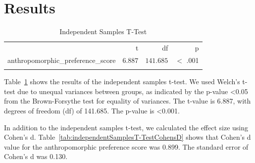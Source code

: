 \documentclass[conference]{IEEEtran}
\begin{document}
\section{Results}
\begin{table}[h]
	\centering
	\caption{Independent Samples T-Test}
	\label{tab:independentSamplesT-Test}
	{
		\begin{tabular}{lrrr}
			\toprule
			$ $ & t & df & p  \\
			\cmidrule[0.4pt]{1-4}
			anthropomorphic\_preference\_score & $6.887$ & $141.685$ & $<$ .001  \\
			\bottomrule
			\addlinespace[1ex]
			\multicolumn{4}{p{0.5\linewidth}}{\textit{Note.} Welch's t-test.} \\
		\end{tabular}
	}
\end{table}

Table~\ref{tab:independentSamplesT-Test} shows the results of the independent samples t-test. We used Welch’s t-test due to unequal variances between groups, as indicated by the p-value \textless 0.05 from the Brown-Forsythe test for equality of variances. The t-value is 6.887, with degrees of freedom (df) of 141.685. The p-value is \textless 0.001.               

\begin{table}[h]
    \centering
    \caption{Independent Samples T-Test with Effect Size}
    \label{tab:independentSamplesT-TestCohensD}
\end{table}

In addition to the independent samples t-test, we calculated the effect size using Cohen’s d. Table~\ref{tab:independentSamplesT-TestCohensD} shows that Cohen’s d value for the anthropomorphic preference score was 0.899. The standard error of Cohen’s d was 0.130.

\begin{table}[h]
    \centering
    \caption{Regression Coefficients Table}
    \label{tab:regressionCoefficientsTable}
\end{table}
\end{document}

